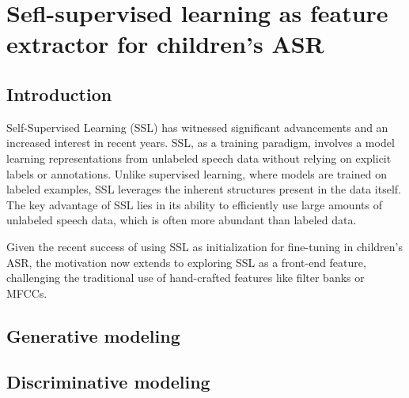 \chapter{Sefl-supervised learning as feature extractor for children's ASR}
\label{chapter:appendixB}

\section{Introduction}
Self-Supervised Learning (SSL) has witnessed significant advancements and an increased interest in recent years. SSL, as a training paradigm, involves a model learning representations from unlabeled speech data without relying on explicit labels or annotations. Unlike supervised learning, where models are trained on labeled examples, SSL leverages the inherent structures present in the data itself. The key advantage of SSL lies in its ability to efficiently use large amounts of unlabeled speech data, which is often more abundant than labeled data.


Given the recent success of using SSL as initialization for fine-tuning in children's ASR, the motivation now extends to exploring SSL as a front-end feature, challenging the traditional use of hand-crafted features like filter banks or MFCCs.
\section{Generative modeling}
\section{Discriminative modeling}


